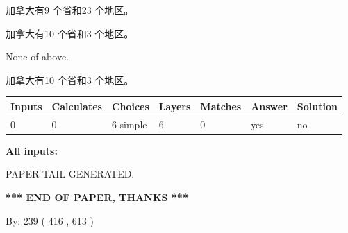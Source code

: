 \documentclass{ctexart}
\begin{document}
 
加拿大有9 个省和23 个地区。
 
 
加拿大有10 个省和3 个地区。
 
 
 None of above.
 
 
\noindent{}
 
 
加拿大有10 个省和3 个地区。
 
 
\noindent{}
 
 
   
   
   
   
\noindent\begin{tabular}{|l|l|l|l|l|l|l|}
 \hline
Inputs & Calculates & Choices & Layers & Matches & Answer & Solution \\ \hline
 0  & 
 0  & 
 6
  simple  
  & 
 6  & 
 0  & 
  yes & 
  no 
  \\ \hline
 \end{tabular}
   
   
   
   
\noindent{}
   
   
   
   
\noindent\vspace{0.1in}\hspace{-0.08in} {\textbf{\Large{All inputs: }}}
   
   
   
   
   
   
 \vspace{0.2in}
 
   
   
\vspace{2.0in} PAPER TAIL GENERATED.
   
   
   
   
\vspace{1.0in} 
{\textbf{\large{ *** END OF PAPER, THANKS *** }}} 
   
   
\hspace{1.0in} By: 
 239 ( 416 ,  613 )
   
   
   
   
\newpage 
\setcounter{page}{ 
   476001 } 
   
   
   
\end{document}
